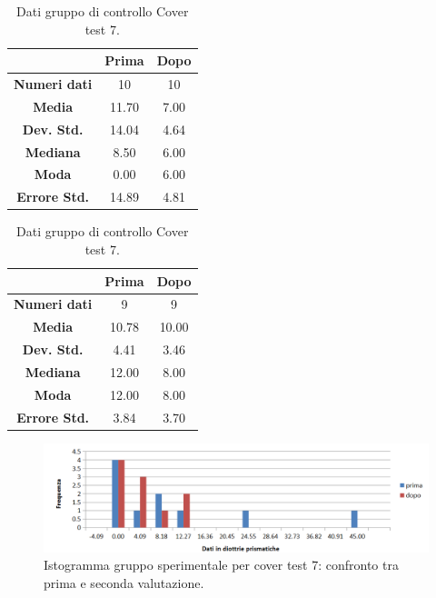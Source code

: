 \begin{table}
\centering
\setlength\tabcolsep{4pt}
\begin{minipage}{0.48\textwidth}
\centering

\begin{tabular}{|c|c|c|} \hline
{\textbf{}} & {\textbf{  \hspace{8pt}Prima\hspace{8pt} }} & {\textbf{ \hspace{8pt}Dopo\hspace{8pt}  }}\\ \hline
\textbf{Numeri dati} & 10 & 10 \\ 
\textbf{Media} & 11.70 & 7.00 \\  
\textbf{Dev. Std.} & 14.04 & 4.64 \\  
\textbf{Mediana} & 8.50 & 6.00 \\ 
\textbf{Moda} & 0.00 & 6.00 \\ 
\textbf{Errore Std.} & 14.89 & 4.81 \\ 
\hline
\end{tabular}
\caption{Dati gruppo sperimentale Cover test 7.}

\label{tab:accuracy} 
\end{minipage}%
\hfill
\begin{minipage}{0.48\textwidth}
\centering

\begin{tabular}{|c|c|c|} \hline
{\textbf{}} & {\textbf{  \hspace{8pt}Prima\hspace{8pt} }} & {\textbf{ \hspace{8pt}Dopo\hspace{8pt}  }}\\ \hline
\textbf{Numeri dati} & 9 & 9 \\ 
\textbf{Media} & 10.78 & 10.00 \\  
\textbf{Dev. Std.} & 4.41 & 3.46 \\  
\textbf{Mediana} & 12.00 & 8.00 \\  
\textbf{Moda} & 12.00 & 8.00 \\
\textbf{Errore Std.} & 3.84 & 3.70 \\
\hline
\end{tabular}
\caption{Dati gruppo di controllo Cover test 7.}

 \label{tab:ompdiff} 
\end{minipage}
\end{table}
 \begin{figure}[h!]
	\centering
	\includegraphics[scale=0.38]{source/grafici/COVER_TEST_7_TRATTATI_NUOVO.png}
	\caption[Istogramma gruppo sperimentale per cover test 7]{Istogramma gruppo sperimentale per cover test 7: confronto tra prima e seconda valutazione.}
	\label{fig:issuexample}
\end{figure}
